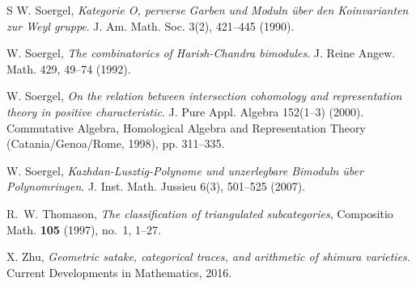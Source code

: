 \documentclass{amsart}
\theoremstyle{definition}
\numberwithin{equation}{subsection}
\begin{document}
\begin{thebibliography}{S}
        W. Soergel, \emph{Kategorie O, perverse Garben und Moduln über den Koinvarianten zur Weyl gruppe}. J. Am. Math. Soc. 3(2), 421–445 (1990).
    
        W. Soergel, \emph{The combinatorics of Harish-Chandra bimodules}. J. Reine Angew. Math. 429, 49–74 (1992). 
    
        W. Soergel, \emph{On the relation between intersection cohomology and representation theory in positive characteristic}. J. Pure Appl. Algebra 152(1–3) (2000). Commutative Algebra, Homological Algebra and Representation Theory (Catania/Genoa/Rome, 1998), pp. 311–335.
    
        W. Soergel, \emph{Kazhdan-Lusztig-Polynome und unzerlegbare Bimoduln über Polynomringen}. J. Inst. Math. Jussieu 6(3), 501–525 (2007).
    
        R.~W. Thomason, \emph{The classification of triangulated subcategories}, Compositio Math. {\bf 105} (1997), no.~1, 1--27.

        X. Zhu, \emph{Geometric satake, categorical traces, and arithmetic of shimura varieties}. Current Developments in Mathematics, 2016.
    

    \end{thebibliography}
\end{document}
